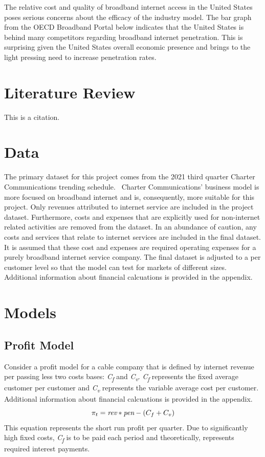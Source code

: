 \documentclass[a4paper,oneside]{article}
\begin{document}
	The relative cost and quality of broadband internet access in the United States poses
	serious concerns about the efficacy of the industry model. The bar graph from the OECD
	Broadband Portal below indicates that the United States is behind many competitors regarding
	broadband internet penetration. This is surprising given the United States overall economic
	presence and brings to the light pressing need to increase penetration rates.

\section{Literature Review}

	This is a citation. ~\citep{Dixit_1989}

\section{Data}

\:\:\:\:\:\: The primary dataset for this project comes from the 2021 third quarter Charter Communications trending schedule.~\citep{chtr_rep} 
Charter Communications' business model is more focused on broadband internet and is, consequently, more suitable for this project.
Only revenues attributed to internet service are included in the project dataset. 
Furthermore, costs and expenses that are explicitly used for non-internet related activities are removed from the dataset.
In an abundance of caution, any costs and services that relate to internet services are included in the final dataset. 
It is assumed that these cost and expenses are required operating expenses for a purely broadband internet service company.
The final dataset is adjusted to a per customer level so that the model can test for markets of different sizes.
Additional information about financial calcuations is provided in the appendix.

\section{Models}
\subsection{Profit Model}
\:\:\:\:\:\: Consider a profit model for a cable company that is defined by internet revenue per passing less two costs bases: \emph{C\textsubscript{f}} and \emph{C\textsubscript{v}}. 
\emph{C\textsubscript{f}} represents the fixed average customer per customer and \emph{C\textsubscript{v}} represents the variable average cost per customer. 
Additional information about financial calcuations is provided in the appendix. 
\begin{equation}
	\pi_{t} = \emph{rev} * \emph{pen} - (C_{f}+C_{v})
\end{equation}
This equation represents the short run profit per quarter. 
Due to significantly high fixed costs, \emph{C\textsubscript{f}} is to be paid each period and theoretically, represents required interest payments.
\end{document}
